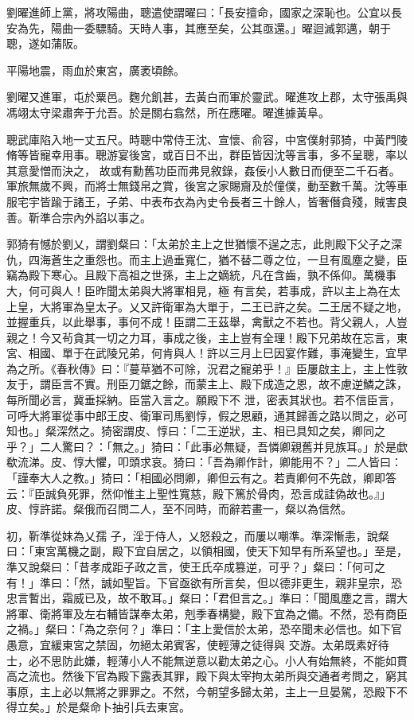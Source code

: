 \begin{pinyinscope}
 劉曜進師上黨，將攻陽曲，聰遣使謂曜曰：「長安擅命，國家之深恥也。公宜以長安為先，陽曲一委驃騎。天時人事，其應至矣，公其亟還。」曜迴滅郭邁，朝于聰，遂如蒲阪。



 平陽地震，雨血於東宮，廣袤頃餘。



 劉曜又進軍，屯於粟邑。麴允飢甚，去黃白而軍於靈武。曜進攻上郡，太守張禹與馮翊太守梁肅奔于允吾。於是關右翕然，所在應曜。曜進據黃阜。



 聰武庫陷入地一丈五尺。時聰中常侍王沈、宣懷、俞容，中宮僕射郭猗，中黃門陵脩等皆寵幸用事。聰游宴後宮，或百日不出，群臣皆因沈等言事，多不呈聰，率以其意愛憎而決之，
 故或有勳舊功臣而弗見敘錄，姦佞小人數日而便至二千石者。軍旅無歲不興，而將士無錢帛之賞，後宮之家賜齎及於僮僕，動至數千萬。沈等車服宅宇皆踰于諸王，子弟、中表布衣為內史令長者三十餘人，皆奢僭貪殘，賊害良善。靳準合宗內外諂以事之。



 郭猗有憾於劉乂，謂劉粲曰：「太弟於主上之世猶懷不逞之志，此則殿下父子之深仇，四海蒼生之重怨也。而主上過垂寬仁，猶不替二尊之位，一旦有風塵之變，臣竊為殿下寒心。且殿下高祖之世孫，主上之嫡統，凡在含齒，孰不係仰。萬機事大，何可與人！臣昨聞太弟與大將軍相見，極
 有言矣，若事成，許以主上為在太上皇，大將軍為皇太子。乂又許衛軍為大單于，二王已許之矣。二王居不疑之地，並握重兵，以此舉事，事何不成！臣謂二王茲舉，禽獸之不若也。背父親人，人豈親之！今又茍貪其一切之力耳，事成之後，主上豈有全理！殿下兄弟故在忘言，東宮、相國、單于在武陵兄弟，何肯與人！許以三月上巳因宴作難，事淹變生，宜早為之所。《春秋傳》曰：『蔓草猶不可除，況君之寵弟乎！』臣屢啟主上，主上性敦友于，謂臣言不實。刑臣刀鋸之餘，而蒙主上、殿下成造之恩，故不慮逆鱗之誅，每所聞必言，冀垂採納。臣當入言之。願殿下不
 泄，密表其狀也。若不信臣言，可呼大將軍從事中郎王皮、衛軍司馬劉惇，假之恩顧，通其歸善之路以問之，必可知也。」粲深然之。猗密謂皮、惇曰：「二王逆狀，主、相已具知之矣，卿同之乎？」二人驚曰？：「無之。」猗曰：「此事必無疑，吾憐卿親舊并見族耳。」於是歔欷流涕。皮、惇大懼，叩頭求哀。猗曰：「吾為卿作計，卿能用不？」二人皆曰：「謹奉大人之教。」猗曰：「相國必問卿，卿但云有之。若責卿何不先啟，卿即答云：『臣誠負死罪，然仰惟主上聖性寬慈，殿下篤於骨肉，恐言成詿偽故也。』」皮、惇許諾。粲俄而召問二人，至不同時，而辭若畫一，粲以為信然。



 初，靳準從妹為乂孺
 子，淫于侍人，乂怒殺之，而屢以嘲準。準深慚恚，說粲曰：「東宮萬機之副，殿下宜自居之，以領相國，使天下知早有所系望也。」至是，準又說粲曰：「昔孝成距子政之言，使王氏卒成篡逆，可乎？」粲曰：「何可之有！」準曰：「然，誠如聖旨。下官亟欲有所言矣，但以德非更生，親非皇宗，恐忠言暫出，霜威已及，故不敢耳。」粲曰：「君但言之。」準曰：「聞風塵之言，謂大將軍、衛將軍及左右輔皆謀奉太弟，剋季春構變，殿下宜為之備。不然，恐有商臣之禍。」粲曰：「為之奈何？」準曰：「主上愛信於太弟，恐卒聞未必信也。如下官愚意，宜緩東宮之禁固，勿絕太弟賓客，使輕薄之徒得與
 交游。太弟既素好待士，必不思防此嫌，輕薄小人不能無逆意以勸太弟之心。小人有始無終，不能如貫高之流也。然後下官為殿下露表其罪，殿下與太宰拘太弟所與交通者考問之，窮其事原，主上必以無將之罪罪之。不然，今朝望多歸太弟，主上一旦晏駕，恐殿下不得立矣。」於是粲命卜抽引兵去東宮。




\end{pinyinscope}

